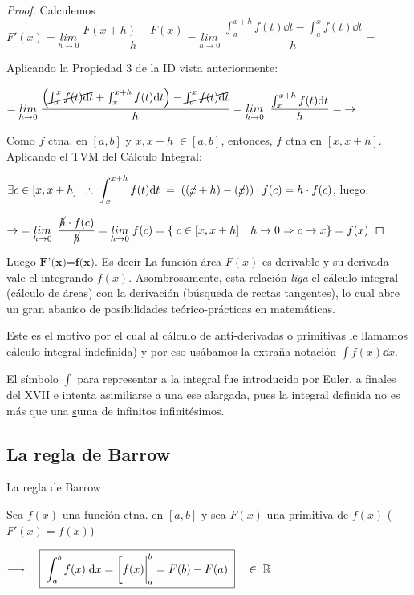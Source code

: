 \begin{proof}
	Calculemos $F'(x)=\underset{h\to 0}{lim}\; {\dfrac {F(x+h)-F(x)}{h}}= \displaystyle \underset{h\to 0}{lim}\; {\dfrac {\int_a^{x+h}f(t) \dd t - \int_a^x f(t) \dd t}{h}} =$
	
	Aplicando la Propiedad 3 de la ID vista anteriormente:
	
	$= \displaystyle \underset{h\to 0}{lim}\; {\dfrac { \left( \cancel{\int_a^{x}f(t) \dd t} + \int_x^{x+h} f(t) \dd t\right) - \cancel{\int_a^x f(t) \dd t}}{h}} = \displaystyle \underset{h\to 0}{lim}\;\;  {\dfrac { \int_x^{x+h} f(t) \dd t}{h}} = \; \to $
	
	Como $f$ ctna. en $[a,b]$ y $x, x+h \; \in [a,b]$, entonces, $f$ ctna en $[x,x+h]$. Aplicando el TVM del Cálculo Integral:
	
	$\exists c\in [x,x+h] \;\;  \therefore  \; \displaystyle \int_x^{x+h} f(t) \dd t\; = \;  \left( (\cancel{x}+h)-(\cancel{x}) \right)\cdot f(c)=h\cdot f(c)$, luego:
	
	$\displaystyle \to \; = \underset{h\to 0}{lim}\;\;  {\dfrac {\cancel{h} \cdot f(c)}{\cancel{h}}} = \underset{h\to 0}{lim}\;{f(c)} = \left\{
	 \; c \in [x,x+h]  \quad h\to 0 \Rightarrow c\to x  
	 \right\}= f(x)$	
\end{proof}

	 Luego $\textbf{F'(x)=f(x)}$. Es decir La función área $F(x)$ es derivable y su derivada vale el integrando $f(x)$. \underline{Asombrosamente}, esta relación \emph{liga} el cálculo integral (cálculo de áreas) con la derivación (búsqueda de rectas tangentes), lo cual abre un gran abanico de posibilidades teórico-prácticas en matemáticas.
	 
	 Este es el motivo por el cual al cálculo de anti-derivadas o primitivas le llamamos cálculo integral indefinida) y por eso usábamos la extraña notación $\int f(x) \dd x$.
	 
	 El símbolo $\displaystyle \int$ para representar a la integral fue introducido por Euler, a finales del XVII e intenta asimiliarse a una ese  alargada, pues la integral definida no es más que una \underline{s}uma de infinitos infinitésimos.

\subsection{La regla de Barrow}

\begin{teor}{La regla de Barrow}
\label{Barrrow}

Sea $f(x)$ una función ctna. en $[a,b]$ y sea $F(x)$ una primitiva de $f(x)$ ($F'(x)=f(x)$) 

$\longrightarrow \quad \displaystyle \boxed{ \; \int_a^b f(x)\; \dd x = \eval[f(x)|_a^b = F(b)-F(a)\;}  \quad \in \; \mathbb R$ 	
\end{teor}

